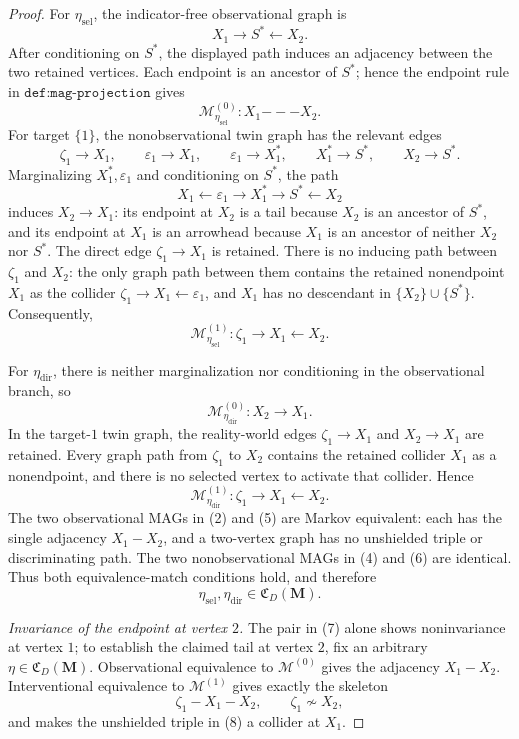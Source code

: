 \documentclass{article}
\begin{document}
\begin{proof}
For \(\eta_{\mathrm{sel}}\), the indicator-free observational graph is
\[
 X_1\longrightarrow S^*\longleftarrow X_2.
\]
After conditioning on \(S^*\), the displayed path induces an adjacency between the
two retained vertices.  Each endpoint is an ancestor of \(S^*\); hence the endpoint
rule in \(\texttt{def:mag-projection}\) gives
\[
 \mathcal M_{\eta_{\mathrm{sel}}}^{(0)}:
 X_1\mathbin{---}X_2.
 \tag{2}
\]
For target \(\{1\}\), the nonobservational twin graph has the relevant edges
\[
 \zeta_1\to X_1,
 \qquad
 \varepsilon_1\to X_1,
 \qquad
 \varepsilon_1\to X_1^*,
 \qquad
 X_1^*\to S^*,
 \qquad
 X_2\to S^*.
 \tag{3}
\]
Marginalizing \(X_1^*,\varepsilon_1\) and conditioning on \(S^*\), the path
\[
 X_1\leftarrow\varepsilon_1\to X_1^*\to S^*\leftarrow X_2
\]
induces \(X_2\to X_1\): its endpoint at \(X_2\) is a tail because \(X_2\) is an
ancestor of \(S^*\), and its endpoint at \(X_1\) is an arrowhead because \(X_1\) is
an ancestor of neither \(X_2\) nor \(S^*\).  The direct edge
\(\zeta_1\to X_1\) is retained.  There is no inducing path between \(\zeta_1\) and
\(X_2\): the only graph path between them contains the retained nonendpoint
\(X_1\) as the collider \(\zeta_1\to X_1\leftarrow\varepsilon_1\), and \(X_1\)
has no descendant in \(\{X_2\}\cup\{S^*\}\).  Consequently,
\[
 \mathcal M_{\eta_{\mathrm{sel}}}^{(1)}:
 \zeta_1\longrightarrow X_1\longleftarrow X_2.
 \tag{4}
\]

For \(\eta_{\mathrm{dir}}\), there is neither marginalization nor conditioning in the
observational branch, so
\[
 \mathcal M_{\eta_{\mathrm{dir}}}^{(0)}:
 X_2\longrightarrow X_1.
 \tag{5}
\]
In the target-\(1\) twin graph, the reality-world edges
\(\zeta_1\to X_1\) and \(X_2\to X_1\) are retained.  Every graph path from
\(\zeta_1\) to \(X_2\) contains the retained collider \(X_1\) as a nonendpoint,
and there is no selected vertex to activate that collider.  Hence
\[
 \mathcal M_{\eta_{\mathrm{dir}}}^{(1)}:
 \zeta_1\longrightarrow X_1\longleftarrow X_2.
 \tag{6}
\]
The two observational MAGs in (2) and (5) are Markov equivalent: each has the
single adjacency \(X_1-X_2\), and a two-vertex graph has no unshielded triple or
discriminating path.  The two nonobservational MAGs in (4) and (6) are identical.
Thus both equivalence-match conditions hold, and therefore
\[
 \eta_{\mathrm{sel}},\eta_{\mathrm{dir}}
 \in\mathfrak C_D(\mathbf M).
 \tag{7}
\]

\emph{Invariance of the endpoint at vertex \(2\).}
The pair in (7) alone shows noninvariance at vertex \(1\); to establish the claimed
tail at vertex \(2\), fix an arbitrary
\(\eta\in\mathfrak C_D(\mathbf M)\).  Observational equivalence to
\(\mathcal M^{(0)}\) gives the adjacency \(X_1-X_2\).  Interventional equivalence to
\(\mathcal M^{(1)}\) gives exactly the skeleton
\[
 \zeta_1-X_1-X_2,
 \qquad
 \zeta_1\not\sim X_2,
 \tag{8}
\]
and makes the unshielded triple in (8) a collider at \(X_1\).


\end{proof}
\end{document}

